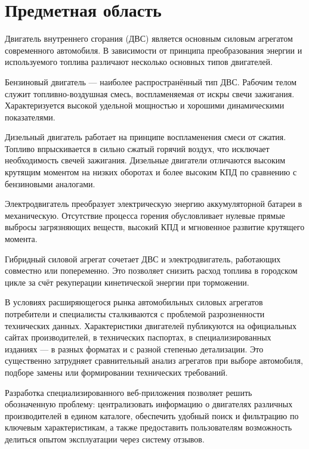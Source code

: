 \documentclass[14pt,a4paper]{extarticle}
\begin{document}
\section{Предметная область}

Двигатель внутреннего сгорания (ДВС) является основным силовым агрегатом современного автомобиля. В зависимости от принципа преобразования энергии и используемого топлива различают несколько основных типов двигателей.

Бензиновый двигатель --- наиболее распространённый тип ДВС. Рабочим телом служит топливно-воздушная смесь, воспламеняемая от искры свечи зажигания. Характеризуется высокой удельной мощностью и хорошими динамическими показателями.

Дизельный двигатель работает на принципе воспламенения смеси от сжатия. Топливо впрыскивается в сильно сжатый горячий воздух, что исключает необходимость свечей зажигания. Дизельные двигатели отличаются высоким крутящим моментом на низких оборотах и более высоким КПД по сравнению с бензиновыми аналогами.

Электродвигатель преобразует электрическую энергию аккумуляторной батареи в механическую. Отсутствие процесса горения обусловливает нулевые прямые выбросы загрязняющих веществ, высокий КПД и мгновенное развитие крутящего момента.

Гибридный силовой агрегат сочетает ДВС и электродвигатель, работающих совместно или попеременно. Это позволяет снизить расход топлива в городском цикле за счёт рекуперации кинетической энергии при торможении.

В условиях расширяющегося рынка автомобильных силовых агрегатов потребители и специалисты сталкиваются с проблемой разрозненности технических данных. Характеристики двигателей публикуются на официальных сайтах производителей, в технических паспортах, в специализированных изданиях --- в разных форматах и с разной степенью детализации. Это существенно затрудняет сравнительный анализ агрегатов при выборе автомобиля, подборе замены или формировании технических требований.

Разработка специализированного веб-приложения позволяет решить обозначенную проблему: централизовать информацию о двигателях различных производителей в едином каталоге, обеспечить удобный поиск и фильтрацию по ключевым характеристикам, а также предоставить пользователям возможность делиться опытом эксплуатации через систему отзывов.

\newpage

\end{document}
